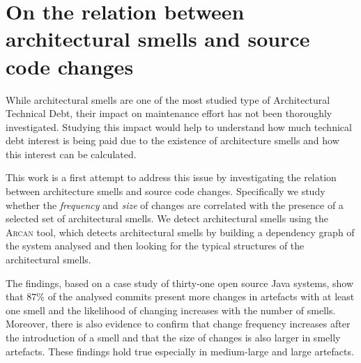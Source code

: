 \setlength{\headheight}{1.2cm}
\renewcommand{\publ}{\flushleft\footnotesize{Based on:\\[0.1cm]
		\textit{D. Sas, P. Avgeriou, I. Pigazzini, and F. Arcelli F. (2022). On the relation between architectural smells and source code changes. Journal of Software: Evolution and Process, 34(1), e2398.} \\[0.1cm]
}}

\chapter{On the relation between architectural smells and source code changes}
\label{chap:5}


\begin{Abstract}
	While architectural smells are one of the most studied type of Architectural Technical Debt, their impact on maintenance effort has not been thoroughly investigated.
	Studying this impact would help to understand how much technical debt interest is being paid due to the existence of architecture smells and how this interest can be calculated.
	
	This work is a first attempt to address this issue by investigating the relation between architecture smells and source code changes. Specifically we study whether the \emph{frequency} and \emph{size} of changes are correlated with the presence of a selected set of architectural smells.
	We detect architectural smells using the \textsc{Arcan} tool, which detects architectural smells by building a dependency graph of the system analysed and then looking for the typical structures of the architectural smells.
	
	The findings, based on a case study of thirty-one open source Java systems, show that $87$\% of the analysed commits present more changes in artefacts with at least one smell and the likelihood of changing increases with the number of smells.
	Moreover, there is also evidence to confirm that change frequency increases after the introduction of a smell and that the size of changes is also larger in smelly artefacts.
	These findings hold true especially in medium-large and large artefacts.
\end{Abstract}

